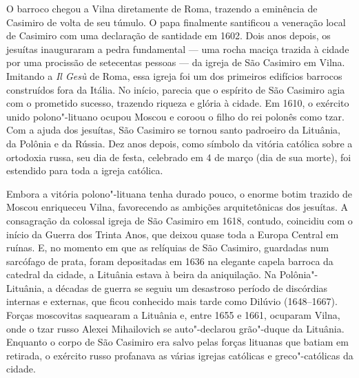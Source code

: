 \asterisc

O barroco chegou a Vilna diretamente de Roma, trazendo a eminência de
Casimiro de volta de seu túmulo. O papa finalmente santificou a
veneração local de Casimiro com uma declaração de santidade em 1602.
Dois anos depois, os jesuítas inauguraram a pedra fundamental --- uma
rocha maciça trazida à cidade por uma procissão de setecentas pessoas ---
da igreja de São Casimiro em Vilna. Imitando a \textit{Il Gesù} de Roma,
essa igreja foi um dos primeiros edifícios barrocos construídos fora da
Itália. No início, parecia que o espírito de São Casimiro agia com o
prometido sucesso, trazendo riqueza e glória à cidade. Em 1610, o
exército unido polono"-lituano ocupou Moscou e coroou o filho do rei
polonês como tzar. Com a ajuda dos jesuítas, São Casimiro se tornou
santo padroeiro da Lituânia, da Polônia e da Rússia. Dez anos depois,
como símbolo da vitória católica sobre a ortodoxia russa, seu dia de
festa, celebrado em 4 de março (dia de sua morte), foi estendido para
toda a igreja católica.

Embora a vitória polono"-lituana tenha durado pouco, o enorme botim
trazido de Moscou enriqueceu Vilna, favorecendo as ambições
arquitetônicas dos jesuítas. A consagração da colossal igreja de São
Casimiro em 1618, contudo, coincidiu com o início da Guerra dos Trinta
Anos, que deixou quase toda a Europa Central em ruínas. E, no momento em
que as relíquias de São Casimiro, guardadas num sarcófago de prata,
foram depositadas em 1636 na elegante capela barroca da catedral da
cidade, a Lituânia estava à beira da aniquilação. Na Polônia"-Lituânia, a
décadas de guerra se seguiu um desastroso período de discórdias internas
e externas, que ficou conhecido mais tarde como Dilúvio (1648--1667).
Forças moscovitas saquearam a Lituânia e, entre 1655 e 1661, ocuparam
Vilna, onde o tzar russo Alexei Mihailovich se auto"-declarou grão"-duque
da Lituânia. Enquanto o corpo de São Casimiro era salvo pelas forças
lituanas que batiam em retirada, o exército russo profanava as várias
igrejas católicas e greco"-católicas da cidade.

%

